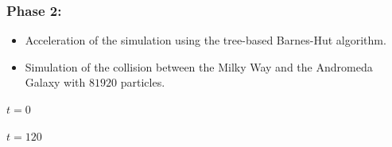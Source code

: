 \begin{frame}[fragile]
  \frametitle{Phase 2:}
  
  \begin{itemize}
      \item Acceleration of the simulation using the tree-based Barnes-Hut algorithm.
      \item Simulation of the collision between the Milky Way and the Andromeda Galaxy with $\num{81920}$ particles.
  \end{itemize}
  \vspace*{0.5em}
  \begin{figure}
      \centering
      \hspace{1em}
      \DisplayRightArrow
      \hspace{1em}
  \end{figure}
  \begin{minipage}{.47\textwidth}
    \centering
    $t = \num{0}$
  \end{minipage}
  \hfill
  \begin{minipage}{.47\textwidth}
    \centering
    $t = \num{120}$
  \end{minipage}

\end{frame}

